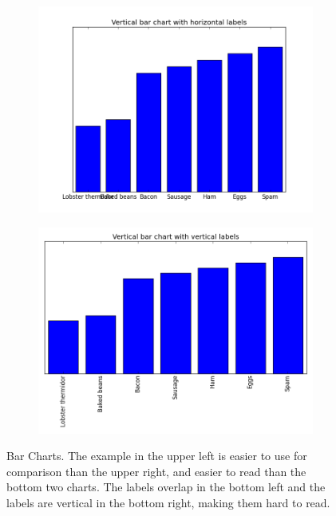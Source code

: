 \begin{figure}[H]
\begin{subfigure}{.45\textwidth}
  \includegraphics[width=\textwidth]{bar_chart_vertical_bars_horizontal_labels.png}
\end{subfigure}
\begin{subfigure}{.45\textwidth}
  \centering
  \includegraphics[width=\textwidth]{bar_chart_vertical_bars_vertical_labels.png}
\end{subfigure}

\caption{Bar Charts.
The example in the upper left is easier to use for comparison than the upper right, and easier to read than the bottom two charts.
The labels overlap in the bottom left and the labels are vertical in the bottom right, making them hard to read.}
\label{fig:barchart}
\end{figure}


